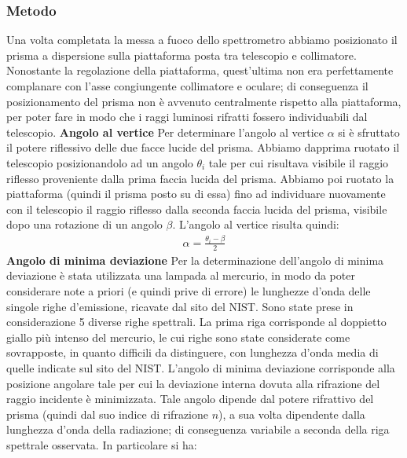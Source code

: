\documentclass[a4paper]{article}
\begin{document}
\subsubsection{Metodo}
Una volta completata la messa a fuoco dello spettrometro abbiamo posizionato il prisma a dispersione sulla piattaforma posta tra telescopio e collimatore. Nonostante la regolazione della piattaforma, quest'ultima non era perfettamente complanare con l'asse congiungente collimatore e oculare; di conseguenza il posizionamento del prisma non è avvenuto centralmente rispetto alla piattaforma, per poter fare in modo che i raggi luminosi rifratti fossero individuabili dal telescopio.
\newline
\newline
\textbf{Angolo al vertice} \newline
Per determinare l'angolo al vertice $\alpha$ si è sfruttato il potere riflessivo delle due facce lucide del prisma. Abbiamo dapprima ruotato il telescopio posizionandolo ad un angolo $\theta_i$ tale per cui risultava visibile il raggio riflesso proveniente dalla prima faccia lucida del prisma. Abbiamo poi ruotato la piattaforma (quindi il prisma posto su di essa) fino ad individuare nuovamente con il telescopio il raggio riflesso dalla seconda faccia lucida del prisma, visibile dopo una rotazione di un angolo $\beta$. L'angolo al vertice risulta quindi:
\begin{align}
    \alpha = \frac{\theta_i -\beta}{2}
\label{eq:angolo al vertice}
\end{align}
\textbf{Angolo di minima deviazione}\newline
Per la determinazione dell'angolo di minima deviazione è stata utilizzata una lampada al mercurio, in modo da poter considerare note a priori (e quindi prive di errore) le lunghezze d'onda delle singole righe d'emissione, ricavate dal sito del NIST.
Sono state prese in considerazione 5 diverse righe spettrali. La prima riga corrisponde al doppietto giallo più intenso del mercurio, le cui righe sono state considerate come sovrapposte, in quanto difficili da distinguere, con lunghezza d'onda media di quelle indicate sul sito del NIST.
L'angolo di minima deviazione corrisponde alla posizione angolare tale per cui la deviazione interna dovuta alla rifrazione del raggio incidente è minimizzata. Tale angolo dipende dal potere rifrattivo del prisma (quindi dal suo indice di rifrazione $n$), a sua volta dipendente dalla lunghezza d'onda della radiazione; di conseguenza variabile a seconda della riga spettrale osservata. In particolare si ha:
\end{document}
